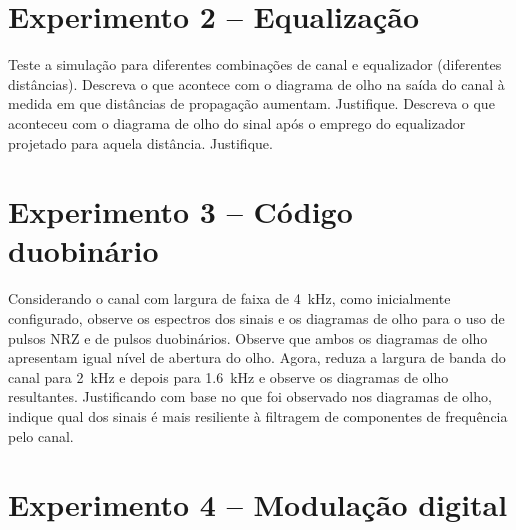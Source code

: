 \documentclass[12pt,addpoints]{exam}
\begin{document}
\section*{Experimento 2 -- Equalização}

\begin{questions}
    \question Teste a simulação para diferentes combinações de canal e equalizador (diferentes distâncias). Descreva o que acontece com o diagrama de olho na saída do canal à medida em que distâncias de propagação aumentam. Justifique.
    \fillwithlines{1.25in}
    \question Descreva o que aconteceu com o diagrama de olho do sinal após o emprego do equalizador projetado para aquela distância. Justifique.
    \fillwithlines{0.75in}
\end{questions}

\section*{Experimento 3 -- Código duobinário}

\begin{questions}
    \question Considerando o canal com largura de faixa de 4~kHz, como inicialmente configurado, observe os espectros dos sinais e os diagramas de olho para o uso de pulsos NRZ e de pulsos duobinários. Observe que ambos os diagramas de olho apresentam igual nível de abertura do olho. Agora, reduza a largura de banda do canal para 2~kHz e depois para 1.6~kHz e observe os diagramas de olho resultantes. Justificando com base no que foi observado nos diagramas de olho, indique qual dos sinais é mais resiliente à filtragem de componentes de frequência pelo canal.
    \fillwithlines{0.75in}
\end{questions}

 \section*{Experimento 4 -- Modulação digital}
\end{document}
